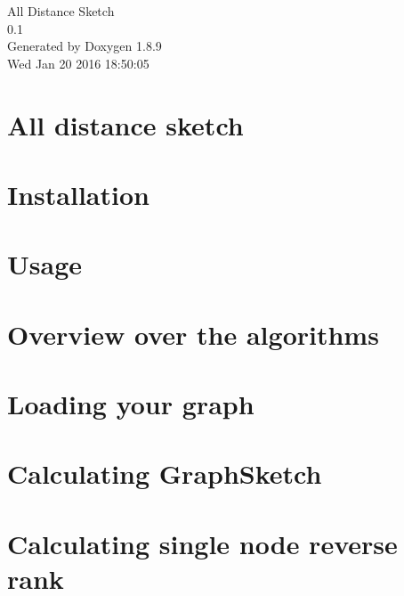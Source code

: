 \documentclass[twoside]{book}
\newcommand{\+}{\discretionary{\mbox{\scriptsize$\hookleftarrow$}}{}{}}
\newcommand{\clearemptydoublepage}{%
  \newpage{\pagestyle{empty}\cleardoublepage}%
}
\begin{document}
\hypersetup{pageanchor=false,
             bookmarks=true,
             bookmarksnumbered=true,
             pdfencoding=unicode
            }
\begin{titlepage}
\vspace*{7cm}
\begin{center}%
{\Large All Distance Sketch \\[1ex]\large 0.\+1 }\\
\vspace*{1cm}
{\large Generated by Doxygen 1.8.9}\\
\vspace*{0.5cm}
{\small Wed Jan 20 2016 18:50:05}\\
\end{center}
\end{titlepage}
\clearemptydoublepage
\tableofcontents
\clearemptydoublepage
{}
\hypersetup{pageanchor=true}

\chapter{All distance sketch}
\label{index}\hypertarget{index}{}
\chapter{Installation}
\label{Install}
\hypertarget{Install}{}

\chapter{Usage}
\label{usage}
\hypertarget{usage}{}

\chapter{Overview over the algorithms}
\label{Overview}
\hypertarget{Overview}{}

\chapter{Loading your graph}
\label{GraphTut}
\hypertarget{GraphTut}{}

\chapter{Calculating Graph\+Sketch}
\label{GraphSketchTut}
\hypertarget{GraphSketchTut}{}

\chapter{Calculating single node reverse rank}
\label{ReverseRankTut}
\hypertarget{ReverseRankTut}{}

\end{document}
